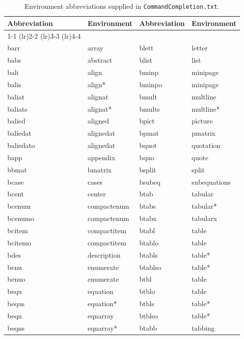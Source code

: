 \documentclass[11pt]{article}
\newcommand{\CCT}{\texttt{CommandCompletion.txt}}
\begin{document}
\begin{table}[!h]
\small
\centering
\caption{Environment abbreviations supplied in \CCT.}
\label{tbl:environments}
\vspace{10pt}
\begin{tabular}{llll}
\textbf{Abbreviation} & \textbf{Environment} & \textbf{Abbreviation} & \textbf{Environment} \\
\cmidrule[0.5pt](lr){1-1} \cmidrule[0.5pt](lr){2-2} \cmidrule[0.5pt](lr){3-3} \cmidrule[0.5pt](lr){4-4}\\
barr      & array       & blett   & letter \\
babs      & abstract    & blist   & list \\
bali      & align       & bminp   & minipage \\
balis     & align*      & bminpo  & minipage \\
baliat    & alignat     & bmult   & multline \\
baliats   & alignat*    & bmults  & multline* \\
balied    & aligned     & bpict   & picture \\
baliedat  & alignedat   & bpmat   & pmatrix \\
baliedato & alignedat   & bquot   & quotation \\
bapp      & appendix    & bquo    & quote \\
bbmat     & bmatrix     & bsplit  & split \\
bcase     & cases       & bsubeq  & subequations \\
bcent     & center      & btab    & tabular \\
bcenum    & compactenum & btabs   & tabular* \\
bcenumo   & compactenum & btabx   & tabularx \\
bcitem    & compactitem & btabl   & table \\
bcitemo   & compactitem & btablo  & table \\
bdes      & description & btabls  & table* \\
benu      & enumerate   & btablso & table* \\
benuo     & enumerate   & btbl    & table \\
bequ      & equation    & btblo   & table \\
bequs     & equation*   & btbls   & table* \\
beqn      & eqnarray    & btblso  & table* \\
beqns     & eqnarray*   & btabb   & tabbing \\

\end{tabular}
\end{table}
\end{document}

